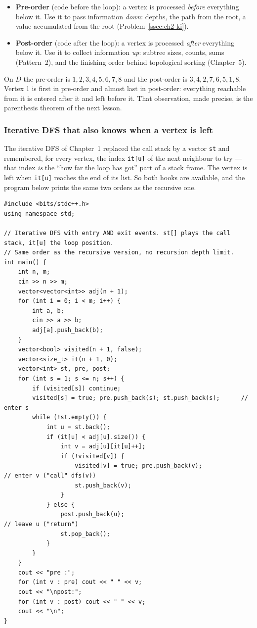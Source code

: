 \begin{itemize}[leftmargin=*]
    \item \textbf{Pre-order} (code before the loop): a vertex is processed \emph{before} everything below it. Use it to pass information \emph{down}: depths, the path from the root, a value accumulated from the root (Problem~\ref{ssec:ch2-ki}).
    \item \textbf{Post-order} (code after the loop): a vertex is processed \emph{after} everything below it. Use it to collect information \emph{up}: subtree sizes, counts, sums (Pattern~2), and the finishing order behind topological sorting (Chapter~5).
\end{itemize}
On $D$ the pre-order is $1,2,3,4,5,6,7,8$ and the post-order is $3,4,2,7,6,5,1,8$. Vertex 1 is first in pre-order and almost last in post-order: everything reachable from it is entered after it and left before it. That observation, made precise, is the parenthesis theorem of the next lesson.

\subsubsection*{Iterative DFS that also knows when a vertex is left}

The iterative DFS of Chapter~1 replaced the call stack by a vector \texttt{st} and remembered, for every vertex, the index \texttt{it[u]} of the next neighbour to try --- that index \emph{is} the ``how far the loop has got'' part of a stack frame. The vertex is left when \texttt{it[u]} reaches the end of its list. So both hooks are available, and the program below prints the same two orders as the recursive one.

\begin{lstlisting}[style=cpp]
#include <bits/stdc++.h>
using namespace std;

// Iterative DFS with entry AND exit events. st[] plays the call stack, it[u] the loop position.
// Same order as the recursive version, no recursion depth limit.
int main() {
    int n, m;
    cin >> n >> m;
    vector<vector<int>> adj(n + 1);
    for (int i = 0; i < m; i++) {
        int a, b;
        cin >> a >> b;
        adj[a].push_back(b);
    }
    vector<bool> visited(n + 1, false);
    vector<size_t> it(n + 1, 0);
    vector<int> st, pre, post;
    for (int s = 1; s <= n; s++) {
        if (visited[s]) continue;
        visited[s] = true; pre.push_back(s); st.push_back(s);      // enter s
        while (!st.empty()) {
            int u = st.back();
            if (it[u] < adj[u].size()) {
                int v = adj[u][it[u]++];
                if (!visited[v]) {
                    visited[v] = true; pre.push_back(v);              // enter v ("call" dfs(v))
                    st.push_back(v);
                }
            } else {
                post.push_back(u);                                    // leave u ("return")
                st.pop_back();
            }
        }
    }
    cout << "pre :";
    for (int v : pre) cout << " " << v;
    cout << "\npost:";
    for (int v : post) cout << " " << v;
    cout << "\n";
}
\end{lstlisting}

